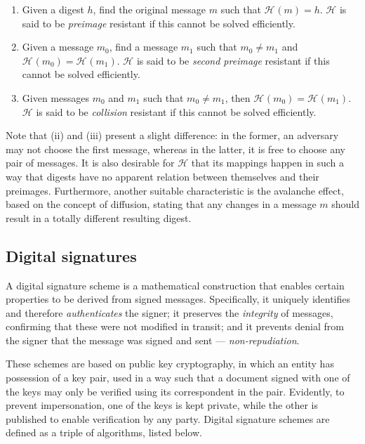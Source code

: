 \documentclass[12pt]{article}
\newcommand{\hh}{\mathcal{H}}
\newcommand{\hash}[2][]{\mathcal{H}^{#1} (#2)}
\begin{document}
\begin{enumerate}[label=(\roman*)]
  \item Given a digest $h$, find the original message $m$ such that
    $\hash{m} = h$. $\hh{}$ is said to be \emph{preimage} resistant if
    this cannot be solved efficiently.
  \item Given a message $m_0$, find a message $m_1$ such that $m_0 \neq m_1$
    and $\hash{m_0} = \hash{m_1}$. $\hh{}$ is said to be \emph{second preimage}
    resistant if this cannot be solved efficiently.
  \item Given messages $m_0$ and $m_1$ such that $m_0 \neq m_1$, then
    $\hash{m_0} = \hash{m_1}$. $\hh{}$ is said to be \emph{collision} resistant
    if this cannot be solved efficiently.
\end{enumerate}

Note that (ii) and (iii) present a slight difference: in the former, an
adversary may not choose the first message, whereas in the latter, it is free
to choose any pair of messages. It is also desirable for $\hh{}$ that its
mappings happen in such a way that digests have no apparent relation between
themselves and their preimages. Furthermore, another suitable characteristic is
the avalanche effect, based on the concept of diffusion, stating that any
changes in a message $m$ should result in a totally different resulting digest.

\subsection*{Digital signatures}

A digital signature scheme is a mathematical construction that enables certain
properties to be derived from signed messages. Specifically, it uniquely
identifies and therefore \emph{authenticates} the signer; it preserves the
\emph{integrity} of messages, confirming that these were not modified in
transit; and it prevents denial from the signer that the message was signed and
sent --- \emph{non-repudiation}.

These schemes are based on public key cryptography, in which an entity has
possession of a key pair, used in a way such that a document signed with one of
the keys may only be verified using its correspondent in the pair. Evidently,
to prevent impersonation, one of the keys is kept private, while the other is
published to enable verification by any party. Digital signature schemes are
defined as a triple of algorithms, listed below.
\end{document}
